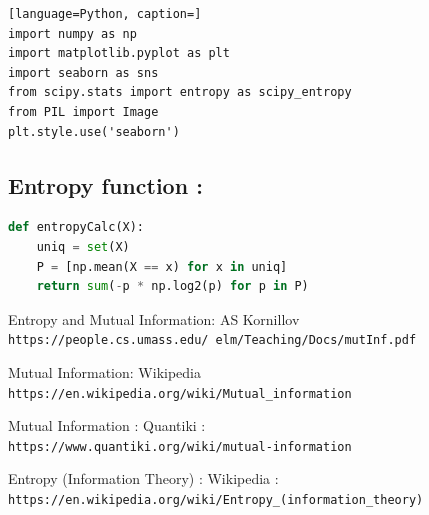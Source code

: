 \documentclass{article}
\begin{document}
\begin{lstlisting}[language=Python, caption=]
import numpy as np
import matplotlib.pyplot as plt
import seaborn as sns
from scipy.stats import entropy as scipy_entropy
from PIL import Image
plt.style.use('seaborn')
\end{lstlisting}

\subsection{Entropy function :}



\begin{lstlisting}[language=Python, caption=Entropy Calculator]
def entropyCalc(X):
    uniq = set(X)
    P = [np.mean(X == x) for x in uniq]
    return sum(-p * np.log2(p) for p in P)

\end{lstlisting}

\newpage

\begin{thebibliography}{9}
\label{sec:hello}

Entropy and Mutual Information: \newline
AS Kornillov
\\\texttt{https://people.cs.umass.edu/~elm/Teaching/Docs/mutInf.pdf}

Mutual Information: \newline
Wikipedia 
\\
\texttt{https://en.wikipedia.org/wiki/Mutual_information}

Mutual Information : \newline
Quantiki :
\\
\texttt{https://www.quantiki.org/wiki/mutual-information}

Entropy (Information Theory) : \newline
Wikipedia :
\\
\texttt{https://en.wikipedia.org/wiki/Entropy_(information_theory)}

\end{thebibliography}
\end{document}
